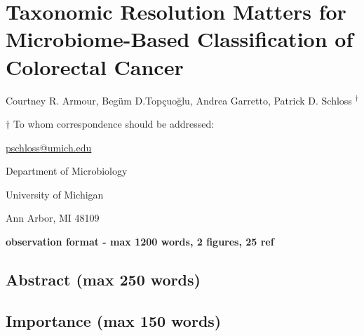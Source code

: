 \documentclass[
]{article}
\author{}
\date{\vspace{-2.5em}}
\begin{document}
\hypertarget{taxonomic-resolution-matters-for-microbiome-based-classification-of-colorectal-cancer}{%
\section{Taxonomic Resolution Matters for Microbiome-Based
Classification of Colorectal
Cancer}\label{taxonomic-resolution-matters-for-microbiome-based-classification-of-colorectal-cancer}}

\vspace{10mm}

Courtney R. Armour, Begüm D.Topçuoğlu, Andrea Garretto, Patrick D.
Schloss \({^\dagger}\)

\vspace{20mm}

\({\dagger}\) To whom correspondence should be addressed:

\href{mailto:pschloss@umich.edu}{pschloss@umich.edu}

Department of Microbiology

University of Michigan

Ann Arbor, MI 48109

\vspace{20mm}

\textbf{observation format - max 1200 words, 2 figures, 25 ref}

\newpage

\hypertarget{abstract-max-250-words}{%
\subsection{Abstract (max 250 words)}\label{abstract-max-250-words}}

\hypertarget{importance-max-150-words}{%
\subsection{Importance (max 150 words)}\label{importance-max-150-words}}

\newpage
\end{document}
